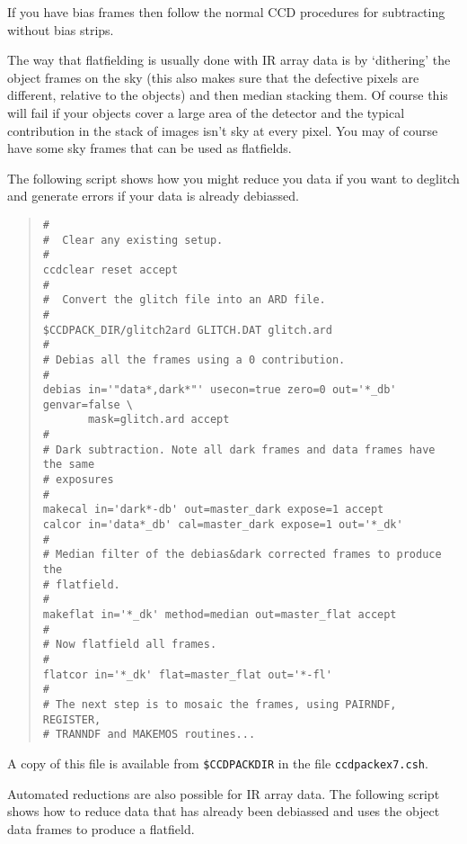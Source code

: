 \documentclass[twoside,11pt]{article}
\newcommand{\latexhtml}[2]{#1}
\renewcommand{\_}{\texttt{\symbol{95}}}
\newcommand{\ttsize}{\latexhtml{\small}{}}
\newenvironment{myquote}{\begin{quote}\ttsize}{\end{quote}}
\newcommand{\text}[1]{{\ttsize \tt #1}}
\begin{document}
If you have bias frames then follow the normal CCD procedures for
subtracting without bias strips.

The way that flatfielding is usually done with IR array data is by
`dithering' the object frames on the sky (this also makes sure that the
defective pixels are different, relative to the objects) and then
median stacking them.
Of course this will fail if your objects cover a large area of the
detector and the typical contribution in the stack of images isn't sky
at every pixel.
You may of course have some sky frames that can be used as flatfields.

The following script shows how you might reduce you data if you want
to deglitch and generate errors if your data is already debiassed.

\begin{center}
\end{center}

\begin{myquote}
\begin{verbatim}
#
#  Clear any existing setup.
#
ccdclear reset accept
#
#  Convert the glitch file into an ARD file.
#
$CCDPACK_DIR/glitch2ard GLITCH.DAT glitch.ard
#
# Debias all the frames using a 0 contribution.
#
debias in='"data*,dark*"' usecon=true zero=0 out='*_db' genvar=false \
       mask=glitch.ard accept
#
# Dark subtraction. Note all dark frames and data frames have the same
# exposures
#
makecal in='dark*-db' out=master_dark expose=1 accept
calcor in='data*_db' cal=master_dark expose=1 out='*_dk'
#
# Median filter of the debias&dark corrected frames to produce the
# flatfield.
#
makeflat in='*_dk' method=median out=master_flat accept
#
# Now flatfield all frames.
#
flatcor in='*_dk' flat=master_flat out='*-fl'
#
# The next step is to mosaic the frames, using PAIRNDF, REGISTER,
# TRANNDF and MAKEMOS routines...
\end{verbatim}
\end{myquote}

A copy of this file is available from
\text{\$CCDPACK\_DIR} in the file \text{ccdpack\_ex7.csh}.

Automated reductions are also possible for IR array data. The
following script shows how to reduce data that has already been
debiassed and uses the object data frames to produce a flatfield.

\begin{center}
\end{center}
\end{document}
